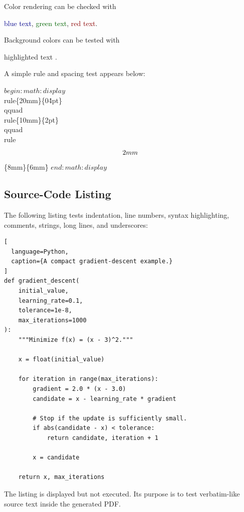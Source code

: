 \documentclass[10pt,a4paper,twocolumn]{article}
\theoremstyle{definition}
\theoremstyle{remark}
\begin{document}
Color rendering can be checked with

\begin{center}
  \textcolor{darkblue}{blue text},
  \qquad
  \textcolor{darkgreen}{green text},
  \qquad
  \textcolor{darkred}{red text}.
\end{center}

Background colors can be tested with

\begin{center}
  \colorbox{yellow!35}{highlighted text}
  \qquad
  .
\end{center}

A simple rule and spacing test appears below:

$begin:math:display$
  \\rule\{20mm\}\{0\.4pt\}
  \\qquad
  \\rule\{10mm\}\{2pt\}
  \\qquad
  \\rule\[\-2mm\]\{8mm\}\{6mm\}\.
$end:math:display$

\subsection{Source-Code Listing}

The following listing tests indentation, line numbers, syntax
highlighting, comments, strings, long lines, and underscores:

\begin{lstlisting}[
  language=Python,
  caption={A compact gradient-descent example.}
]
def gradient_descent(
    initial_value,
    learning_rate=0.1,
    tolerance=1e-8,
    max_iterations=1000
):
    """Minimize f(x) = (x - 3)^2."""

    x = float(initial_value)

    for iteration in range(max_iterations):
        gradient = 2.0 * (x - 3.0)
        candidate = x - learning_rate * gradient

        # Stop if the update is sufficiently small.
        if abs(candidate - x) < tolerance:
            return candidate, iteration + 1

        x = candidate

    return x, max_iterations
\end{lstlisting}

The listing is displayed but not executed. Its purpose is to test
verbatim-like source text inside the generated PDF.
\end{document}
